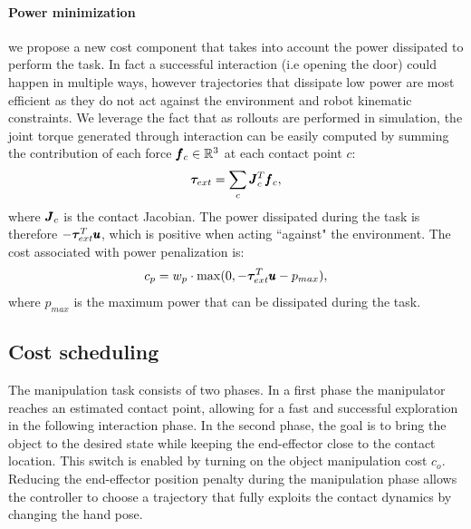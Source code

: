 \paragraph{Power minimization} we propose a new cost component that takes into account the power dissipated to perform the task. In fact a successful interaction (i.e opening the door) could happen in multiple ways, however trajectories that dissipate low power are most efficient as they do not act against the environment and robot kinematic constraints. We leverage the fact that as rollouts are performed in simulation, the joint torque generated through interaction can be easily computed by summing the contribution of each force $\pmb{f}_c \in \mathbb{R}^{3}$ at each contact point $c$:
\begin{equation}
\boldsymbol{\tau}_{ext} = \sum\limits_{c} \pmb{J}_c^T \pmb{f}_c,    
\end{equation}
where $\pmb{J}_c$ is the contact Jacobian. The power dissipated during the task is therefore $-\boldsymbol{\tau}_{ext}^T\pmb{u}$, which is positive when acting ``against" the environment. The cost associated with power penalization is:
\begin{equation}
   c_p = w_{p} \cdot \max(0, - \boldsymbol{\tau}_{ext}^T\pmb{u} - p_{max}),      
 \end{equation}
where $p_{max}$ is the maximum power that can be dissipated during the task.

\subsection{Cost scheduling}
The manipulation task consists of two phases. In a first phase the manipulator reaches an estimated contact point, allowing for a fast and successful exploration in the following interaction phase. In the second phase, the goal is to bring the object to the desired state while keeping the end-effector close to the contact location. This switch is enabled by turning on the object manipulation cost $c_o$. Reducing the end-effector position penalty during the manipulation phase allows the controller to choose a trajectory that fully exploits the contact dynamics by changing the hand pose. 


